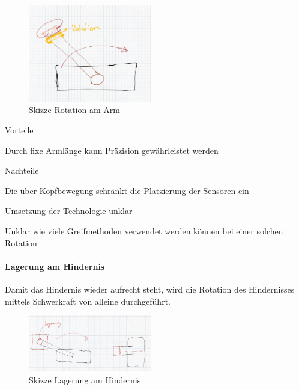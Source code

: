 \documentclass[../main.tex]{subfiles}
\begin{document}
\begin{figure}[H]
        \centering
        \includegraphics[width=0.48\textwidth]{img/technologierecherche/Rotation/ueberkopf_griff_gelagert.jpg}
        \caption{Skizze Rotation am Arm}
        \label{img:tech_ueberkopf_griff_gelagert}
\end{figure}

\begin{minipage}[t]{0.48\textwidth}
    \begin{items}
          \item [Vorteile]
          \item Durch fixe Armlänge kann Präzision gewährleistet werden
    \end{items}
\end{minipage}
\hfill
\begin{minipage}[t]{0.48\textwidth}
    \begin{items}
          \item [Nachteile]
          \item Die über Kopfbewegung schränkt die Platzierung der Sensoren ein
          \item Umsetzung der Technologie unklar
          \item Unklar wie viele Greifmethoden verwendet werden können bei einer solchen Rotation
    \end{items}
\end{minipage}
\newpage
\paragraph{Lagerung am Hindernis}
Damit das Hindernis wieder aufrecht steht, wird die Rotation des Hindernisses mittels Schwerkraft von alleine durchgeführt.

\begin{figure}[H]
        \centering
        \includegraphics[width=0.48\textwidth]{img/technologierecherche/Rotation/ueberkopf_objekt_gelagert.jpg}
        \caption{Skizze Lagerung am Hindernis} 
        \label{img:tech_ueberkopf_objekt_gelagert}
\end{figure}
\end{document}
